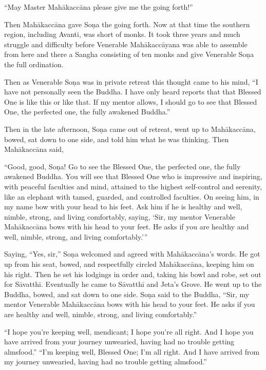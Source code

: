 \documentclass[12pt,openany]{book}%
\begin{document}
“May Master \textsanskrit{Mahākaccāna} please give me the going forth!” 

Then \textsanskrit{Mahākaccāna} gave \textsanskrit{Soṇa} the going forth. Now at that time the southern region, including Avanti, was short of monks. It took three years and much struggle and difficulty before Venerable \textsanskrit{Mahākaccāyana} was able to assemble from here and there a Sangha consisting of ten monks and give Venerable \textsanskrit{Soṇa} the full ordination. 

Then as Venerable \textsanskrit{Soṇa} was in private retreat this thought came to his mind, “I have not personally seen the Buddha. I have only heard reports that that Blessed One is like this or like that. If my mentor allows, I should go to see that Blessed One, the perfected one, the fully awakened Buddha.” 

Then in the late afternoon, \textsanskrit{Soṇa} came out of retreat, went up to \textsanskrit{Mahākaccāna}, bowed, sat down to one side, and told him what he was thinking. Then \textsanskrit{Mahākaccāna} said, 

“Good, good, \textsanskrit{Soṇa}! Go to see the Blessed One, the perfected one, the fully awakened Buddha. You will see that Blessed One who is impressive and inspiring, with peaceful faculties and mind, attained to the highest self-control and serenity, like an elephant with tamed, guarded, and controlled faculties. On seeing him, in my name bow with your head to his feet. Ask him if he is healthy and well, nimble, strong, and living comfortably, saying, ‘Sir, my mentor Venerable \textsanskrit{Mahākaccāna} bows with his head to your feet. He asks if you are healthy and well, nimble, strong, and living comfortably.’” 

Saying, “Yes, sir,” \textsanskrit{Soṇa} welcomed and agreed with \textsanskrit{Mahākaccāna}’s words. He got up from his seat, bowed, and respectfully circled \textsanskrit{Mahākaccāna}, keeping him on his right. Then he set his lodgings in order and, taking his bowl and robe, set out for \textsanskrit{Sāvatthī}. Eventually he came to \textsanskrit{Sāvatthī} and Jeta’s Grove. He went up to the Buddha, bowed, and sat down to one side. \textsanskrit{Soṇa} said to the Buddha, “Sir, my mentor Venerable \textsanskrit{Mahākaccāna} bows with his head to your feet. He asks if you are healthy and well, nimble, strong, and living comfortably.” 

“I hope you’re keeping well, mendicant; I hope you’re all right. And I hope you have arrived from your journey unwearied, having had no trouble getting almsfood.” “I’m keeping well, Blessed One; I’m all right. And I have arrived from my journey unwearied, having had no trouble getting almsfood.” 
\end{document}
